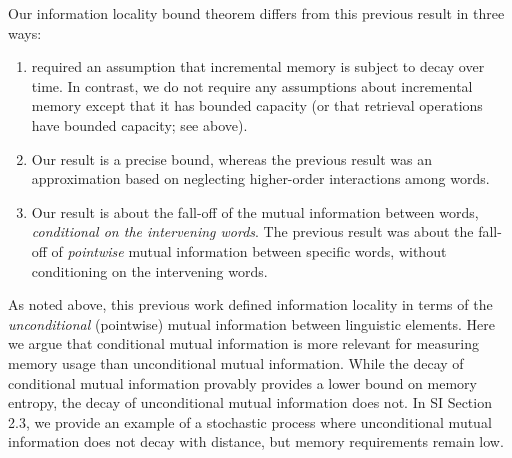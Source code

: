Our information locality bound theorem differs from this previous result in three ways:
\begin{enumerate}
    \item \citet{futrell2020lossy} required an assumption that incremental memory is subject to decay over time. In contrast, we do not require any assumptions about incremental memory except that it has bounded capacity (or that retrieval operations have bounded capacity; see above).
    \item Our result is a precise bound, whereas the previous result was an approximation based on neglecting higher-order interactions among words.
    \item Our result is about the fall-off of the mutual information between words, \emph{conditional on the intervening words}. The previous result was about the fall-off of \emph{pointwise} mutual information between specific words, without conditioning on the intervening words.
\end{enumerate}

As noted above, this previous work defined information locality in terms of the \emph{unconditional} (pointwise) mutual information between linguistic elements. %
Here we argue that conditional mutual information is more relevant for measuring memory usage than unconditional mutual information. 
While the decay of conditional mutual information provably provides a lower bound on memory entropy, the decay of unconditional mutual information does not.
In SI Section 2.3, we provide an example of a stochastic process where unconditional mutual information does not decay with distance, but memory requirements remain low.







